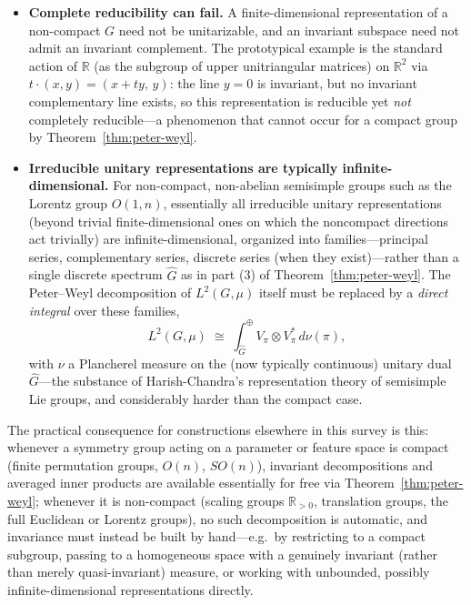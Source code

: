 \documentclass[mathematics,review,submit,moreauthors]{Definitions/mdpi}
\begin{document}
\begin{itemize}
    \item \textbf{Complete reducibility can fail.} A finite-dimensional
    representation of a non-compact $G$ need not be unitarizable, and an
    invariant subspace need not admit an invariant complement. The
    prototypical example is the standard action of $\mathbb{R}$ (as the
    subgroup of upper unitriangular matrices) on $\mathbb{R}^2$ via
    $t \cdot (x,y) = (x + ty,\, y)$: the line $y = 0$ is invariant, but no
    invariant complementary line exists, so this representation is
    reducible yet \emph{not} completely reducible---a phenomenon that
    cannot occur for a compact group by Theorem~\ref{thm:peter-weyl}.
    \item \textbf{Irreducible unitary representations are typically
    infinite-dimensional.} For non-compact, non-abelian semisimple groups
    such as the Lorentz group $O(1,n)$, essentially all irreducible unitary
    representations (beyond trivial finite-dimensional ones on which the
    noncompact directions act trivially) are infinite-dimensional, organized
    into families---principal series, complementary series, discrete series
    (when they exist)---rather than a single discrete spectrum $\widehat{G}$
    as in part (3) of Theorem~\ref{thm:peter-weyl}. The Peter--Weyl
    decomposition of $L^2(G,\mu)$ itself must be replaced by a
    \emph{direct integral} over these families,
    \[
        L^2(G,\mu) \;\cong\; \int_{\widehat{G}}^{\oplus} V_\pi \otimes V_\pi^* \, d\nu(\pi),
    \]
    with $\nu$ a Plancherel measure on the (now typically continuous)
    unitary dual $\widehat{G}$---the substance of Harish-Chandra's
    representation theory of semisimple Lie groups, and considerably harder
    than the compact case.
\end{itemize}

The practical consequence for constructions elsewhere in this survey is
this: whenever a symmetry group acting on a parameter or feature space is
compact (finite permutation groups, $O(n)$, $SO(n)$), invariant
decompositions and averaged inner products are available essentially for
free via Theorem~\ref{thm:peter-weyl}; whenever it is non-compact (scaling
groups $\mathbb{R}_{>0}$, translation groups, the full Euclidean or Lorentz
groups), no such decomposition is automatic, and invariance must instead be
built by hand---e.g.\ by restricting to a compact subgroup, passing to a
homogeneous space with a genuinely invariant (rather than merely
quasi-invariant) measure, or working with unbounded, possibly
infinite-dimensional representations directly.
\end{document}
